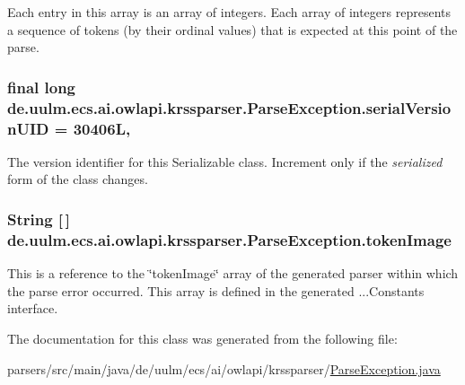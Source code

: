 Each entry in this array is an array of integers. Each array of integers represents a sequence of tokens (by their ordinal values) that is expected at this point of the parse. \hypertarget{classde_1_1uulm_1_1ecs_1_1ai_1_1owlapi_1_1krssparser_1_1_parse_exception_a7ce6d4e45e84b00b60e9a92247ca5ede}{
\subsubsection[{serial\-Version\-U\-I\-D}]{\setlength{\rightskip}{0pt plus 5cm}final long de.\-uulm.\-ecs.\-ai.\-owlapi.\-krssparser.\-Parse\-Exception.\-serial\-Version\-U\-I\-D = 30406\-L\hspace{0.3cm}{\ttfamily [static]}, {\ttfamily [private]}}}\label{classde_1_1uulm_1_1ecs_1_1ai_1_1owlapi_1_1krssparser_1_1_parse_exception_a7ce6d4e45e84b00b60e9a92247ca5ede}
The version identifier for this Serializable class. Increment only if the {\itshape serialized} form of the class changes. \hypertarget{classde_1_1uulm_1_1ecs_1_1ai_1_1owlapi_1_1krssparser_1_1_parse_exception_aaf056082fde061be2e426b3e3ecb86ee}{
\subsubsection[{token\-Image}]{\setlength{\rightskip}{0pt plus 5cm}String \mbox{[}$\,$\mbox{]} de.\-uulm.\-ecs.\-ai.\-owlapi.\-krssparser.\-Parse\-Exception.\-token\-Image}}\label{classde_1_1uulm_1_1ecs_1_1ai_1_1owlapi_1_1krssparser_1_1_parse_exception_aaf056082fde061be2e426b3e3ecb86ee}
This is a reference to the \char`\"{}token\-Image\char`\"{} array of the generated parser within which the parse error occurred. This array is defined in the generated ...Constants interface. 

The documentation for this class was generated from the following file\-:\begin{DoxyCompactItemize}
\item 
parsers/src/main/java/de/uulm/ecs/ai/owlapi/krssparser/\hyperlink{de_2uulm_2ecs_2ai_2owlapi_2krssparser_2_parse_exception_8java}{Parse\-Exception.\-java}\end{DoxyCompactItemize}
